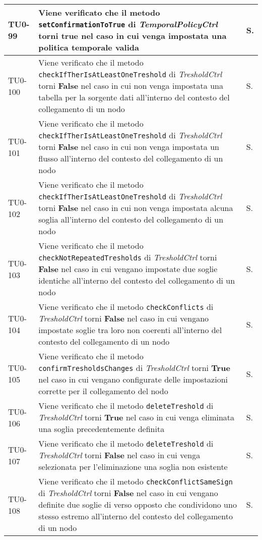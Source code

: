 \begin{longtable}{|C{.15\textwidth}|m{.66\textwidth}|C{.10\textwidth}|}
\hline
TU0-99 & Viene verificato che il metodo \texttt{setConfirmationToTrue} di \textit{TemporalPolicyCtrl} torni \textbf{true} nel caso in cui venga impostata una politica temporale valida & S.\\
\hline
{}TU0-100 & Viene verificato che il metodo \texttt{checkIfTherIsAtLeastOneTreshold} di \textit{TresholdCtrl} torni \textbf{False} nel caso in cui non venga impostata una tabella per la sorgente dati all'interno del contesto del collegamento di un nodo & S.\\
\hline
TU0-101 & Viene verificato che il metodo \texttt{checkIfTherIsAtLeastOneTreshold} di \textit{TresholdCtrl} torni \textbf{False} nel caso in cui non venga impostata un flusso all'interno del contesto del collegamento di un nodo & S.\\
\hline
{}TU0-102 & Viene verificato che il metodo \texttt{checkIfTherIsAtLeastOneTreshold} di \textit{TresholdCtrl} torni \textbf{False} nel caso in cui non venga impostata alcuna soglia all'interno del contesto del collegamento di un nodo & S.\\
\hline
TU0-103 & Viene verificato che il metodo \texttt{checkNotRepeatedTresholds} di \textit{TresholdCtrl} torni \textbf{False} nel caso in cui vengano impostate due soglie identiche all'interno del contesto del collegamento di un nodo & S.\\
\hline
{}TU0-104 & Viene verificato che il metodo \texttt{checkConflicts} di \textit{TresholdCtrl} torni \textbf{False} nel caso in cui vengano impostate soglie tra loro non coerenti all'interno del contesto del collegamento di un nodo & S.\\
\hline
TU0-105 & Viene verificato che il metodo \texttt{confirmTresholdsChanges} di \textit{TresholdCtrl} torni \textbf{True} nel caso in cui vengano configurate delle impostazioni corrette per il collegamento del nodo & S.\\
\hline
{}TU0-106 & Viene verificato che il metodo \texttt{deleteTreshold} di \textit{TresholdCtrl} torni \textbf{True} nel caso in cui venga eliminata una soglia precedentemente definita & S.\\
\hline
TU0-107 & Viene verificato che il metodo \texttt{deleteTreshold} di \textit{TresholdCtrl} torni \textbf{False} nel caso in cui venga selezionata per l'eliminazione una soglia non esistente & S.\\
\hline
{}TU0-108 & Viene verificato che il metodo \texttt{checkConflictSameSign} di \textit{TresholdCtrl} torni \textbf{False} nel caso in cui vengano definite due soglie di verso opposto che condividono uno stesso estremo all'interno del contesto del collegamento di un nodo & S.\\

\end{longtable}

